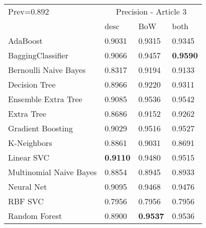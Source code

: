 \begin{tabular}{|l|l|l|l| }
\hline
Prev=0.892 &  \multicolumn{3}{c|}{Precision - Article 3} \\
\cline{2-4} & desc & BoW & both \\ \hline
AdaBoost                & 0.9031 & 0.9315 & 0.9345\\
BaggingClassifier       & 0.9066 & 0.9457 & {\bf 0.9590}\\
Bernoulli Naive Bayes   & 0.8317 & 0.9194 & 0.9133\\
Decision Tree           & 0.8966 & 0.9220 & 0.9311\\
Ensemble Extra Tree     & 0.9085 & 0.9536 & 0.9542\\
Extra Tree              & 0.8686 & 0.9152 & 0.9262\\
Gradient Boosting       & 0.9029 & 0.9516 & 0.9527\\
K-Neighbors             & 0.8861 & 0.9031 & 0.8691\\
Linear SVC              & {\bf 0.9110} & 0.9480 & 0.9515\\
Multinomial Naive Bayes & 0.8854 & 0.8945 & 0.8933\\
Neural Net              & 0.9095 & 0.9468 & 0.9476\\
RBF SVC                 & 0.7956 & 0.7956 & 0.7956\\
Random Forest           & 0.8900 & {\bf 0.9537} & 0.9536\\
\hline
\end{tabular}